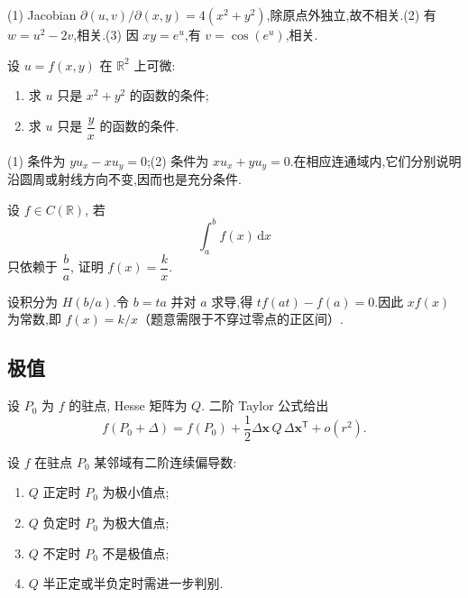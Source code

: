 \begin{solution}
    (1) Jacobian $\partial(u,v)/\partial(x,y)=4(x^2+y^2)$,除原点外独立,故不相关.(2) 有 $w=u^2-2v$,相关.(3) 因 $xy=e^u$,有 $v=\cos(e^u)$,相关.
\end{solution}

\begin{example}
    设 $u=f(x,y)$ 在 $\mathbb{R}^2$ 上可微:
    \begin{enumerate}
        \item 求 $u$ 只是 $x^2+y^2$ 的函数的条件;
        \item 求 $u$ 只是 $\dfrac{y}{x}$ 的函数的条件.
    \end{enumerate}
\end{example}
\exampleblank

\begin{solution}
    (1) 条件为 $yu_x-xu_y=0$;(2) 条件为 $xu_x+yu_y=0$.在相应连通域内,它们分别说明沿圆周或射线方向不变,因而也是充分条件.
\end{solution}

\begin{example}
    设 $f\in C(\mathbb{R})$, 若
    \[
        \int_a^bf(x)\,\mathrm{d}x
    \]
    只依赖于 $\dfrac{b}{a}$, 证明 $f(x)=\dfrac{k}{x}$.
\end{example}
\exampleblank

\begin{solution}
    设积分为 $H(b/a)$.令 $b=ta$ 并对 $a$ 求导,得 $t f(at)-f(a)=0$.因此 $xf(x)$ 为常数,即 $f(x)=k/x$（题意需限于不穿过零点的正区间）.
\end{solution}



\subsection{极值}



设 $P_0$ 为 $f$ 的驻点, Hesse 矩阵为 $Q$. 二阶 Taylor 公式给出
\[
    f(P_0+\Delta)=f(P_0)+\dfrac{1}{2}\Delta\bm x\,Q\,\Delta\bm x^{\mathsf T}+o(r^2).
\]

\begin{theorem}[\markstar]
    设 $f$ 在驻点 $P_0$ 某邻域有二阶连续偏导数:
    \begin{enumerate}
        \item $Q$ 正定时 $P_0$ 为极小值点;
        \item $Q$ 负定时 $P_0$ 为极大值点;
        \item $Q$ 不定时 $P_0$ 不是极值点;
        \item $Q$ 半正定或半负定时需进一步判别.
    \end{enumerate}
\end{theorem}

